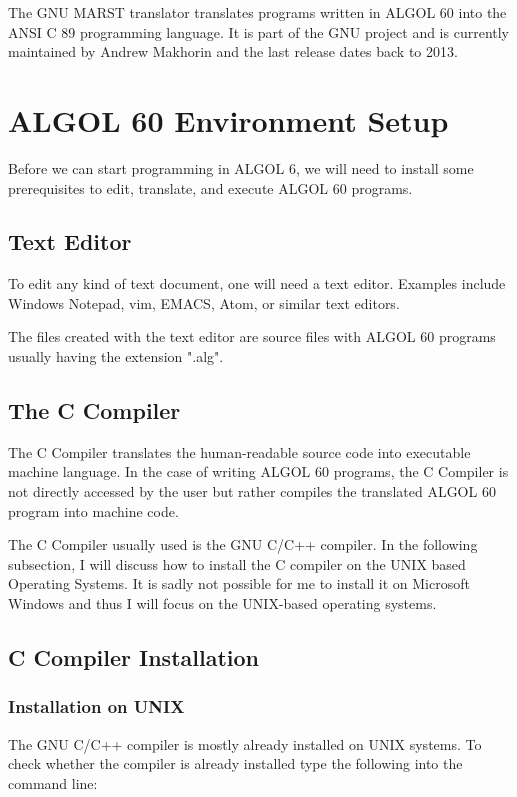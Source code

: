 \documentclass{article}
\begin{document}
The GNU MARST translator translates programs written in ALGOL 60 into the ANSI C 89 programming language. It is part of the GNU project and is currently maintained by Andrew Makhorin and the last release dates back to 2013.

\section{ALGOL 60 Environment Setup}
Before we can start programming in ALGOL 6, we will need to install some prerequisites to edit, translate, and execute ALGOL 60 programs.

\subsection{Text Editor}
To edit any kind of text document, one will need a text editor. Examples include Windows Notepad, vim, EMACS, Atom, or similar text editors. 

The files created with the text editor are source files with ALGOL 60 programs usually having the extension ".alg".

\subsection{The C Compiler}
The C Compiler translates the human-readable source code into executable machine language. In the case of writing ALGOL 60 programs, the C Compiler is not directly accessed by the user but rather compiles the translated ALGOL 60 program into machine code. 

The C Compiler usually used is the GNU C/C++ compiler. In the following subsection, I will discuss how to install the C compiler on the UNIX based Operating Systems. It is sadly not possible for me to install it on Microsoft Windows and thus I will focus on the UNIX-based operating systems.

\subsection{C Compiler Installation}

\subsubsection{Installation on UNIX}
The GNU C/C++ compiler is mostly already installed on UNIX systems. To check whether the compiler is already installed type the following into the command line:
\end{document}
